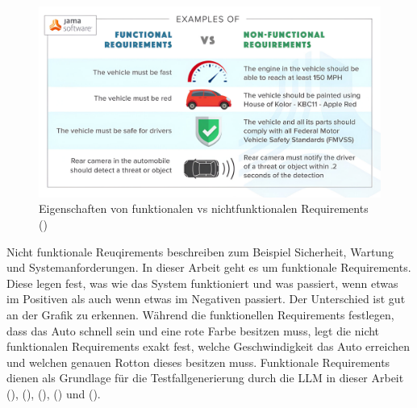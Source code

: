 \documentclass[12pt,toc=bib,toc=listof]{scrreprt}
\begin{document}
\begin{figure}[H]
    \centering
    \includegraphics[width=0.75\linewidth]{./Bilder/Jama Software_Eigenschaften von funktionalen vs nichtfunktionalen Requirements.jpeg}
    \caption{Eigenschaften von funktionalen vs nichtfunktionalen Requirements (\cite{JamaSoftware2024})}
    \label{fig:enter-label}
\end{figure}
\noindent Nicht funktionale Reuqirements beschreiben zum Beispiel Sicherheit, Wartung und Systemanforderungen. In dieser Arbeit geht es um funktionale Requirements. Diese legen fest, was wie das System funktioniert und was passiert, wenn etwas im Positiven als auch wenn etwas im Negativen passiert. Der Unterschied ist gut an der Grafik zu erkennen. Während die funktionellen Requirements festlegen, dass das Auto schnell sein und eine rote Farbe besitzen muss, legt die nicht funktionalen Requirements exakt fest, welche Geschwindigkeit das Auto erreichen und welchen genauen Rotton dieses besitzen muss. Funktionale Requirements dienen als Grundlage für die Testfallgenerierung durch die LLM in dieser Arbeit (\cite{Aysolmaz2018}), (\cite{Barmi2011}), (\cite{JamaSoftware2024}), (\cite{Mustafa2021}) und (\cite{Visure2024}).
\end{document}
